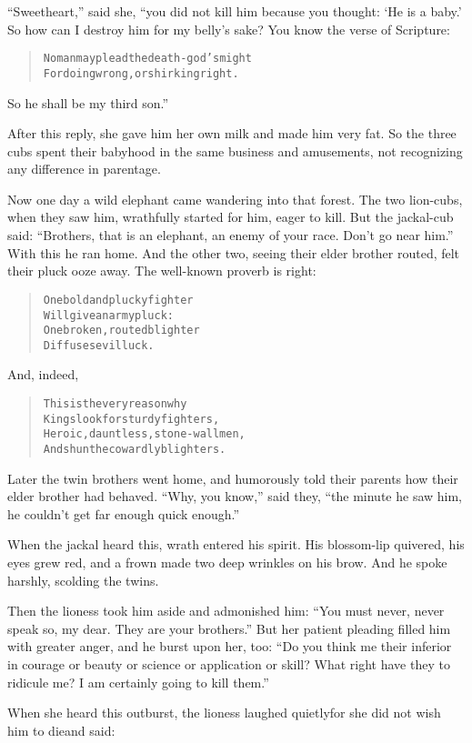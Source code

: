 \documentclass[article, twoside, 14pt]{memoir}
\renewenvironment{verbatim}{%
\begin{quote}%
\vskip -10pt%
\begin{alltt}\normalfont\large}{\end{alltt}%
\end{quote}%
\vskip -10pt
} %
\begin{document}
``Sweetheart,'' said she, “you did not kill him because you
thought: `He is a baby.' So how can I destroy him for my belly's
sake? You know the verse of Scripture:

\begin{verbatim}
No man may plead the death-god's might
For doing wrong, or shirking right.
\end{verbatim}
So he shall be my third son.”

After this reply, she gave him her own milk and made him very fat.
So the three cubs spent their babyhood in the same business and
amusements, not recognizing any difference in parentage.

Now one day a wild elephant came wandering into that forest. The
two lion-cubs, when they saw him, wrathfully started for him, eager
to kill. But the jackal-cub said:
``Brothers, that is an elephant, an enemy of your race. Don't go near him.''
With this he ran home. And the other two, seeing their elder
brother routed, felt their pluck ooze away. The well-known proverb
is right:

\begin{verbatim}
One bold and plucky fighter
    Will give an army pluck:
One broken, routed blighter
    Diffuses evil luck.
\end{verbatim}
And, indeed,

\begin{verbatim}
This is the very reason why
    Kings look for sturdy fighters,
Heroic, dauntless, stone-wall men,
    And shun the cowardly blighters.
\end{verbatim}
Later the twin brothers went home, and humorously told their
parents how their elder brother had behaved. ``Why, you know,''
said they,
``the minute he saw him, he couldn't get far enough quick enough.''


When the jackal heard this, wrath entered his spirit. His
blossom-lip quivered, his eyes grew red, and a frown made two deep
wrinkles on his brow. And he spoke harshly, scolding the twins.

Then the lioness took him aside and admonished him:
``You must never, never speak so, my dear. They are your brothers.''
But her patient pleading filled him with greater anger, and he
burst upon her, too:
``Do you think me their inferior in courage or beauty or science or application or skill? What right have they to ridicule me? I am certainly going to kill them.''

When she heard this outburst, the lioness laughed quietly{\textemdash}for she
did not wish him to die{\textemdash}and said:
\end{document}
